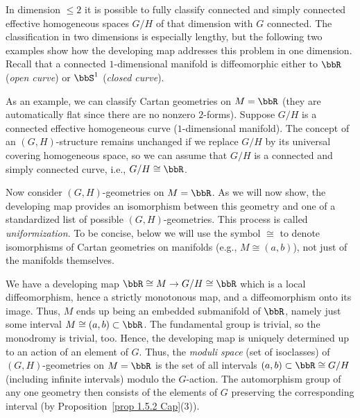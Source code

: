In dimension $\leq 2$ it is possible to fully classify connected and simply connected effective homogeneous spaces $G\slash H$ of that dimension with $G$ connected. The classification in two dimensions is especially lengthy, but the following two examples show how the developing map addresses this problem in one dimension. Recall that a connected $1$-dimensional manifold is diffeomorphic either to $\bbR$ (\emph{open curve}) or $\bbS^1$ (\emph{closed curve}).

\begin{example}
    As an example, we can classify Cartan geometries on $M=\bbR$ (they are automatically flat since there are no nonzero $2$-forms).  Suppose $G\slash H$ is a connected effective homogeneous curve ($1$-dimensional manifold). The concept of an $(G,H)$-structure remains unchanged if we replace $G\slash H$ by its universal covering homogeneous space, so we can assume that $G\slash H$ is a connected and simply connected curve, i.e., $G\slash H\cong \bbR$.

    Now consider $(G,H)$-geometries on $M=\bbR$. As we will now show, the developing map provides an isomorphism between this geometry and one of a standardized list of possible $(G,H)$-geometries. This process is called \emph{uniformization}. To be concise, below we will use the symbol $\cong$ to denote isomorphisms of Cartan geometries on manifolds (e.g., $M\cong (a,b)$), not just of the manifolds themselves.
    
    We have a developing map $\bbR\cong M\to G\slash H\cong \bbR$ which is a local diffeomorphism, hence a strictly monotonous map, and a diffeomorphism onto its image. Thus, $M$ ends up being an embedded submanifold of $\bbR$, namely just some interval $M\cong (a,b)\subset\bbR$. The fundamental group is trivial, so the monodromy is trivial, too. Hence, the developing map is uniquely determined up to an action of an element of $G$. Thus, the \emph{moduli space} (set of isoclasses) of $(G,H)$-geometries on $M=\bbR$ is the set of all intervals $(a,b)\subset\bbR\cong  G\slash H$ (including infinite intervals) modulo the $G$-action. The automorphism group of any one geometry then consists of the elements of $G$ preserving the corresponding interval (by Proposition~\ref{prop 1.5.2 Cap}(3)). 


\end{example}
